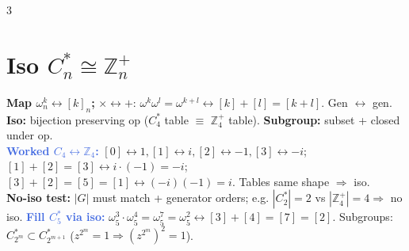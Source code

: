 \documentclass[9pt]{extarticle}
\newcommand{\hl}[1]{\textbf{\textcolor{BrickRed}{#1}}}
\newcommand{\wk}[1]{\textbf{\textcolor{OliveGreen}{#1}}}
\newcommand{\ex}[1]{\textbf{\textcolor{RoyalBlue}{#1}}}
\begin{document}
\begin{multicols}{3}
\section{Iso $C_n^*\cong\mathbb Z_n^+$}
\begin{sloppypar}\raggedright
\hl{Map $\omega_n^k\leftrightarrow[k]_n$;} ${\times}\leftrightarrow{+}$: $\omega^k\omega^l{=}\omega^{k+l}\leftrightarrow[k]{+}[l]{=}[k{+}l]$. Gen $\leftrightarrow$ gen. \hl{Iso:} bijection preserving op ($C_4^*$ table ${\equiv}$ $\mathbb Z_4^+$ table). \hl{Subgroup:} subset + closed under op.\\
\ex{Worked $C_4\leftrightarrow\mathbb Z_4$:} $[0]{\leftrightarrow}1,[1]{\leftrightarrow}i,[2]{\leftrightarrow}{-}1,[3]{\leftrightarrow}{-}i$; $[1]{+}[2]{=}[3]\leftrightarrow i{\cdot}({-}1){=}{-}i$; $[3]{+}[2]{=}[5]{=}[1]\leftrightarrow({-}i)({-}1){=}i$. Tables same shape $\Rightarrow$ iso.\\
\wk{No-iso test:} $|G|$ must match + generator orders; e.g. $|C_2^*|{=}2$ vs $|\mathbb Z_4^+|{=}4\Rightarrow$ no iso. \ex{Fill $C_5^*$ via iso:} $\omega_5^3{\cdot}\omega_5^4{=}\omega_5^7{=}\omega_5^2\leftrightarrow[3]{+}[4]{=}[7]{=}[2]$. Subgroups: $C_{2^m}^*{\subset}C_{2^{m+1}}^*$ ($z^{2^m}{=}1\Rightarrow(z^{2^m})^2{=}1$).
\end{sloppypar}


\end{multicols}
\end{document}
